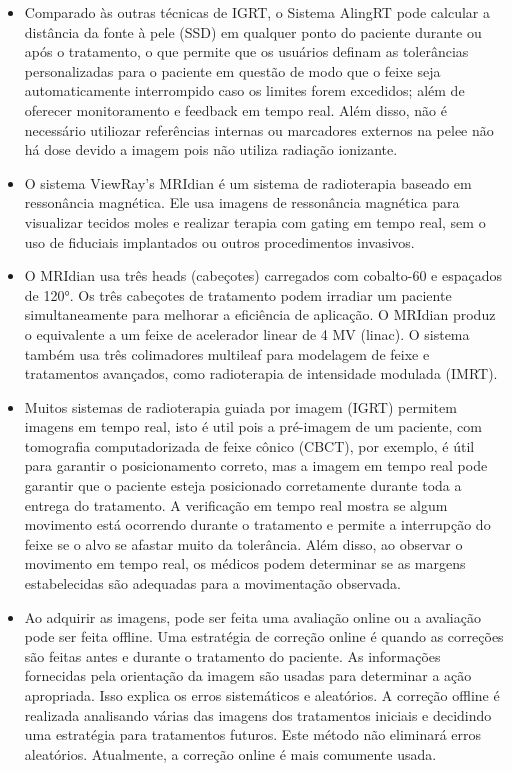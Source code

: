 \documentclass[11pt,a4paper]{article}
\newcounter{exemplo}
\begin{document}
\begin{exemplo}[12. IGRT ]
\begin{itemize}
        \item Comparado às outras técnicas de IGRT, o Sistema AlingRT pode calcular a distância da fonte à pele (SSD) em qualquer ponto do paciente durante ou após o tratamento, o que permite que os usuários definam as tolerâncias personalizadas para o paciente em questão de modo que o feixe seja automaticamente interrompido caso os limites forem excedidos; além de oferecer monitoramento e feedback em tempo real. Além disso,  não é necessário utiliozar referências internas ou marcadores externos na pelee não há dose devido a imagem pois não utiliza radiação ionizante.
        
        \item O sistema ViewRay's MRIdian é um sistema de radioterapia baseado em ressonância magnética. Ele usa imagens de ressonância magnética para visualizar tecidos moles e realizar terapia com gating em tempo real, sem o uso de fiduciais implantados ou outros procedimentos invasivos.
        
        \item O MRIdian usa três heads (cabeçotes) carregados com cobalto-60 e espaçados de 120°. Os três cabeçotes de tratamento podem irradiar um paciente simultaneamente para melhorar a eficiência de aplicação. O MRIdian produz o equivalente a um feixe de acelerador linear de 4 MV (linac). O sistema também usa três colimadores multileaf para modelagem de feixe e tratamentos avançados, como radioterapia de intensidade modulada (IMRT).
        
        \item Muitos sistemas de radioterapia guiada por imagem (IGRT) permitem imagens em tempo real, isto é util pois a pré-imagem de um paciente, com tomografia computadorizada de feixe cônico (CBCT), por exemplo, é útil para garantir o posicionamento correto, mas a imagem em tempo real pode garantir que o paciente esteja posicionado corretamente durante toda a entrega do tratamento. A verificação em tempo real mostra se algum movimento está ocorrendo durante o tratamento e permite a interrupção do feixe se o alvo se afastar muito da tolerância. Além disso, ao observar o movimento em tempo real, os médicos podem determinar se as margens estabelecidas são adequadas para a movimentação observada.
        
        \item Ao adquirir as imagens, pode ser feita uma avaliação online ou a avaliação pode ser feita offline. Uma estratégia de correção online é quando as correções são feitas antes e durante o tratamento do paciente. As informações fornecidas pela orientação da imagem são usadas para determinar a ação apropriada. Isso explica os erros sistemáticos e aleatórios. A correção offline é realizada analisando várias das imagens dos tratamentos iniciais e decidindo uma estratégia para tratamentos futuros. Este método não eliminará erros aleatórios. Atualmente, a correção online é mais comumente usada.

    \end{itemize}
\end{exemplo}
   

\end{document}
